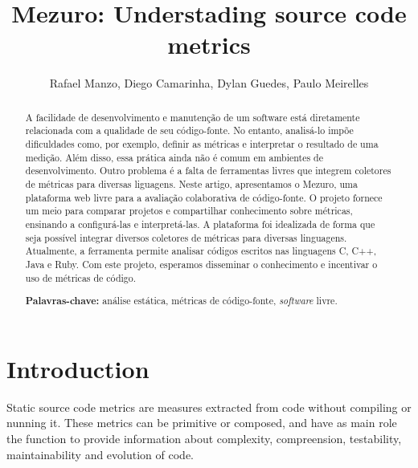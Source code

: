 \documentclass{llncs}
\begin{document}
\sloppy
\title{Mezuro: Understading source code metrics}

\author{Rafael Manzo, Diego Camarinha,
        Dylan Guedes, Paulo Meirelles}


\maketitle
\begin{abstract}
  A facilidade de desenvolvimento e manutenção de um software está
diretamente relacionada com a qualidade de seu código-fonte.
  No entanto, analisá-lo impõe dificuldades como, por exemplo, definir as
métricas e interpretar o resultado de uma medição. Além disso, essa prática
ainda não é comum em ambientes de desenvolvimento. Outro problema é a falta de
ferramentas livres que integrem coletores de métricas para diversas liguagens.
  Neste artigo, apresentamos o Mezuro, uma plataforma web livre para a
avaliação colaborativa de código-fonte. O projeto fornece um meio para comparar
projetos e compartilhar conhecimento sobre métricas, ensinando a configurá-las
e interpretá-las. A plataforma foi idealizada de forma que seja possível
integrar diversos coletores de métricas para diversas linguagens. Atualmente, a
ferramenta permite analisar códigos escritos nas linguagens C, C++, Java e
Ruby.
  Com este projeto, esperamos disseminar o conhecimento e incentivar o uso de
métricas de código.

\textbf{Palavras-chave:} análise estática, métricas de código-fonte,
\textit{software} livre.
\end{abstract}


\section{Introduction}
\label{sec:intro}

Static source code metrics are measures extracted from code without compiling
or nunning it. These metrics can be primitive or composed, and have as main
role the function to provide information about complexity, compreension,
testability, maintainability and evolution of code.
\end{document}
